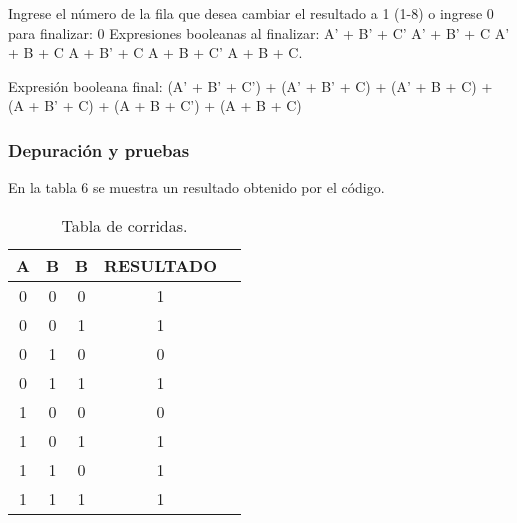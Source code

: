  Ingrese el número de la fila que desea cambiar el resultado a 1 (1-8) o ingrese 0 para finalizar: 0
Expresiones booleanas al finalizar:
A' + B' + C'
A' + B' + C
A' + B + C
A + B' + C
A + B + C'
A + B + C.

Expresión booleana final: (A' + B' + C') + (A' + B' + C) + (A' + B + C) + (A + B' + C) + (A + B + C') + (A + B + C)
\\

\subsubsection {Depuración y pruebas}
En la tabla 6 se muestra un resultado obtenido por el código.
\begin{table}[!ht]
\label{T:equipos}
\begin{center}
\begin{tabular}{| c | c | c | c | c |}
\hline
 \textbf{A} &  \textbf{B} & \textbf{B} & \textbf{RESULTADO}\\
\hline
 0 & 0 & 0 & 1\\
 0 & 0 & 1 & 1 \\
 0 & 1 & 0 &  0\\
 0 & 1 & 1 & 1 \\
 1 & 0 & 0 & 0 \\
 1 & 0 & 1 & 1 \\
 1 & 1 & 0 & 1  \\
 1 & 1 & 1 & 1 \\
\hline
\end{tabular}
\caption{Tabla de corridas.}
\end{center}
\end{table}\\


